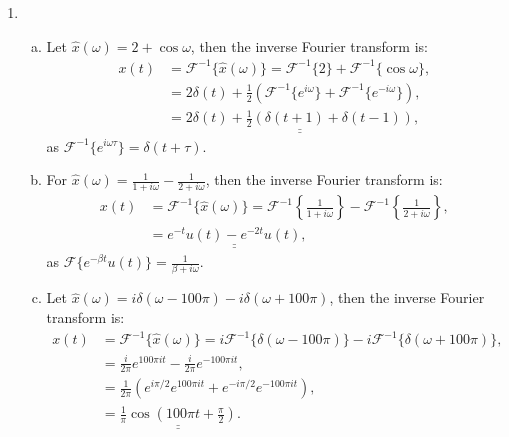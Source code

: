 \begin{enumerate}
  \item
        \begin{enumerate}[a)]
          \item Let $\hat{x}(\omega)=2+\cos\omega$, then the inverse Fourier transform is:
                \begin{align*}
                  x(t) & =\mathcal{F}^{-1}\{\hat{x}(\omega)\}=\mathcal{F}^{-1}\{2\}+\mathcal{F}^{-1}\{\cos\omega\}, \\
                       & =2\delta(t)+\frac{1}{2}(\mathcal{F}^{-1}\{e^{i\omega}\}+\mathcal{F}^{-1}\{e^{-i\omega}\}), \\
                       & =\underline{\underline{2\delta(t)+\frac{1}{2}(\delta(t+1)+\delta(t-1))}},
                \end{align*}
                as $\mathcal{F}^{-1}\{e^{i\omega\tau}\}=\delta(t+\tau)$.

          \item For $\hat{x}(\omega)=\frac{1}{1+i\omega}-\frac{1}{2+i\omega}$, then the inverse Fourier transform is:
                \begin{align*}
                  x(t) & =\mathcal{F}^{-1}\{\hat{x}(\omega)\}=\mathcal{F}^{-1}\left\{\frac{1}{1+i\omega}\right\}-\mathcal{F}^{-1}\left\{\frac{1}{2+i\omega}\right\}, \\
                       & =\underline{\underline{e^{-t}u(t)-e^{-2t}u(t)}},
                \end{align*}
                as $\mathcal{F}\{e^{-\beta t}u(t)\}=\frac{1}{\beta+i\omega}$.

          \item Let $\hat{x}(\omega)=i\delta(\omega-100\pi)-i\delta(\omega+100\pi)$, then the inverse Fourier transform is:
                \begin{align*}
                  x(t) & =\mathcal{F}^{-1}\{\hat{x}(\omega)\}=i\mathcal{F}^{-1}\{\delta(\omega-100\pi)\}-i\mathcal{F}^{-1}\{\delta(\omega+100\pi)\}, \\
                       & =\frac{i}{2\pi}e^{100\pi it}-\frac{i}{2\pi}e^{-100\pi it},                                                                  \\
                       & =\frac{1}{2\pi}(e^{i\pi/2}e^{100\pi i t}+e^{-i\pi/2}e^{-100\pi i t}),                                                       \\
                       & =\underline{\underline{\frac{1}{\pi}\cos\left(100\pi t+\frac{\pi}{2}\right)}}.
                \end{align*}
        \end{enumerate}


\end{enumerate}
